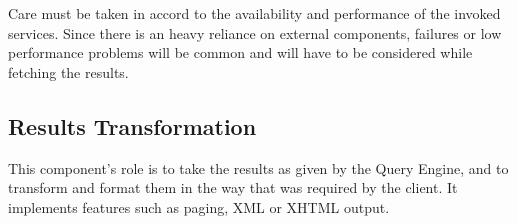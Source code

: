 Care must be taken in accord to the availability and performance of the invoked services. Since there is an heavy reliance on external components, failures or low performance problems will be common and will have to be considered while fetching the results.

\subsection{Results Transformation} %
\label{sub:results_transformation}
This component's role is to take the results as given by the Query Engine, and to transform and format them in the way that was required by the client. It implements features such as paging, XML or XHTML output.


